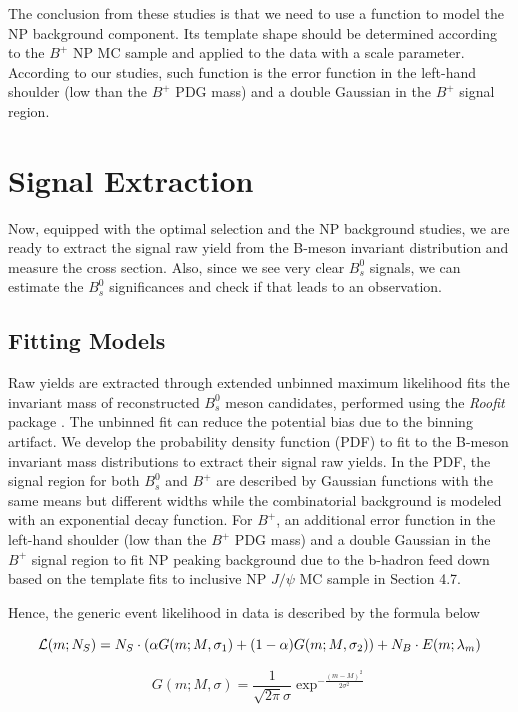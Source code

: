 The conclusion from these studies is that we need to use a function to model the NP background component. Its template shape should be determined according to the $B^+$ NP MC sample and applied to the data with a scale parameter. According to our studies, such function is the error function in the left-hand shoulder (low than the $B^+$ PDG mass) and a double Gaussian in the $B^+$ signal region.

\section{Signal Extraction} 

Now, equipped with the optimal selection and the NP background studies, we are ready to extract the signal raw yield from the B-meson invariant distribution and measure the cross section. Also, since we see very clear $B^0_s$ signals, we can estimate the $B^0_s$ significances and check if that leads to an observation.

\subsection{Fitting Models}

Raw yields are extracted through extended unbinned maximum likelihood fits the invariant mass of reconstructed $B^0_s$ meson candidates, performed using the \textit{Roofit} package \cite{ROOFIT}. The unbinned fit can reduce the potential bias due to the binning artifact. We develop the probability density function (PDF) to fit to the B-meson invariant mass distributions to extract their signal raw yields. In the PDF, the signal region for both $B^0_s$ and $B^+$ are described by Gaussian functions with the same means but different widths while the combinatorial background is modeled with an exponential decay function. For $B^+$, an additional error function in the left-hand shoulder (low than the $B^+$ PDG mass) and a double Gaussian in the $B^+$ signal region to fit NP peaking background due to the  b-hadron feed down based on the template fits to inclusive NP $J/\psi$ MC sample in Section 4.7. 

Hence, the generic event likelihood in data is described by the formula below

\begin{equation}
{\cal{L}}(m;N_S) = N_S \cdot (\alpha G(m;M,\sigma_1) + (1-\alpha) G(m; M,\sigma_2))+ N_B \cdot E(m;\lambda_m)
\end{equation}

\begin{equation}
G(m;M,\sigma) = \frac{1}{\sqrt{2\pi}\sigma} \exp^{-\frac{(m-M)^2}{2\sigma^2}} 
\end{equation}

